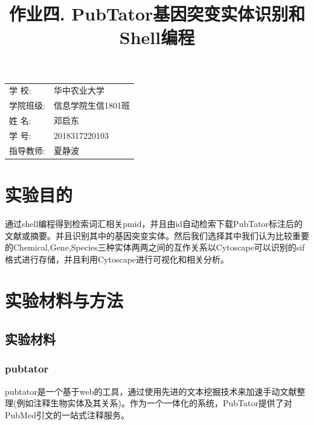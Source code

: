 \documentclass[12pt]{article}
\title{\heiti 作业四. PubTator基因突变实体识别和Shell编程}
\begin{document}
	\maketitle
	
	\vspace{5cm}
	
	\begin{table}[h]
		\centering
		\begin{Large}
			\begin{tabular}{p{3cm} p{7cm}<{\centering}}
				学  \qquad  校: &  华中农业大学     \\ \cline{2-2}
				学院班级:      & 信息学院生信1801班   \\ \cline{2-2}
				姓  \qquad  名: & 邓启东 \\ \cline{2-2}
				学  \qquad  号: & 2018317220103 \\ \cline{2-2}
				指导教师:       &夏静波 \\ \cline{2-2}
			\end{tabular}
		\end{Large}		
	\end{table}
	
	\newpage%

	\tableofcontents
	
	\newpage
	\section{实验目的}
通过shell编程得到检索词汇相关pmid，并且由id自动检索下载PubTator标注后的文献或摘要。并且识别其中的基因突变实体。然后我们选择其中我们认为比较重要的Chemical,Gene,Species三种实体两两之间的互作关系以Cytoscape可以识别的sif格式进行存储，并且利用Cytoscape进行可视化和相关分析。
	\section{实验材料与方法}
	\subsection{实验材料}
	\subsubsection{pubtator}
pubtator是一个基于web的工具，通过使用先进的文本挖掘技术来加速手动文献整理(例如注释生物实体及其关系)。作为一个一体化的系统，PubTator提供了对PubMed引文的一站式注释服务。
\end{document}
